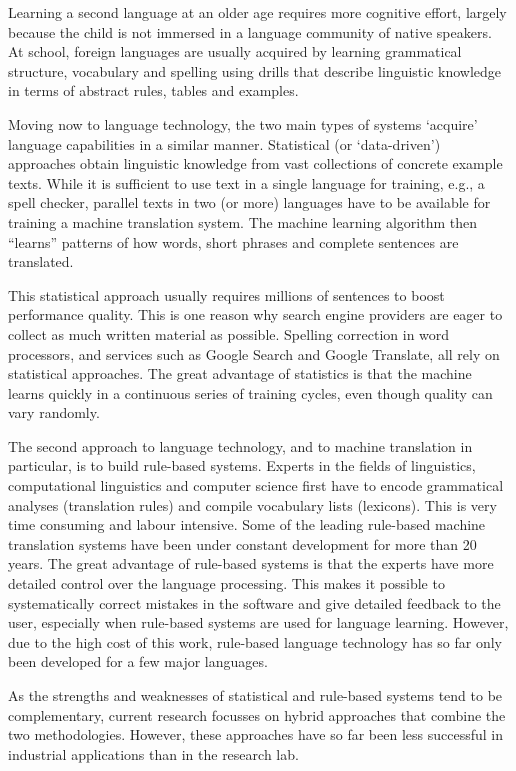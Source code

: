 \documentclass[]{../../metanetpaper}
\begin{document}
\begin{Parallel}[c]{79mm}{78mm}
{Learning a second language at an older age requires more cognitive effort, largely because the child is not immersed in a language community of native speakers. At school, foreign languages are usually acquired by learning grammatical structure, vocabulary and spelling using drills that describe linguistic knowledge in terms of abstract rules, tables and examples.

Moving now to language technology, the two main types of systems ‘acquire’ language capabilities in a similar manner. Statistical (or ‘data-driven’) approaches obtain linguistic knowledge from vast collections of concrete example texts. While it is sufficient to use text in a single language for training, e.g., a spell checker, parallel texts in two (or more) languages have to be available for training a machine translation system. The machine learning algorithm then “learns” patterns of how words, short phrases and complete sentences are translated. 

This statistical approach usually requires millions of sentences to boost performance quality. This is one reason why search engine providers are eager to collect as much written material as possible. Spelling correction in word processors, and services such as Google Search and Google Translate, all rely on statistical approaches. The great advantage of statistics is that the machine learns quickly in a continuous series of training cycles, even though quality can vary randomly.

The second approach to language technology, and to machine translation in particular, is to build rule-based systems. Experts in the fields of linguistics, computational linguistics and computer science first have to encode grammatical analyses (translation rules) and compile vocabulary lists (lexicons). This is very time consuming and labour intensive. Some of the leading rule-based machine translation systems have been under constant development for more than 20 years. The great advantage of rule-based systems is that the experts have more detailed control over the language processing. This makes it possible to systematically correct mistakes in the software and give detailed feedback to the user, especially when rule-based systems are used for language learning. However, due to the high cost of this work, rule-based language technology has so far only been developed for a few major languages. 

As the strengths and weaknesses of statistical and rule-based systems tend to be complementary, current research focusses on hybrid approaches that combine the two methodologies. However, these approaches have so far been less successful in industrial applications than in the research lab. 

}
\end{Parallel}
\end{document}
